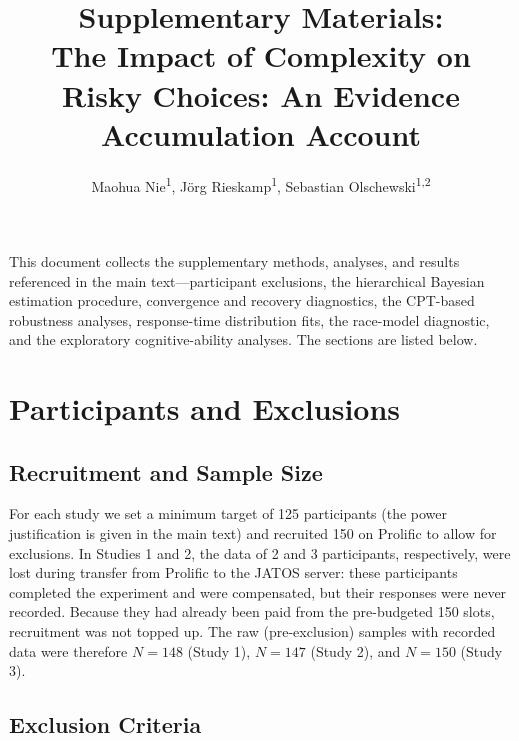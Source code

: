 \documentclass[man,floatsintext]{apa7}
\title{Supplementary Materials:\\The Impact of Complexity on Risky Choices: An Evidence Accumulation Account}
\author{
Maohua Nie\textsuperscript{1}, J\"org Rieskamp\textsuperscript{1}, Sebastian Olschewski\textsuperscript{1,2}
}
\affiliation{
\textsuperscript{1}Department of Psychology, University of Basel, Switzerland\\
\textsuperscript{2}Warwick Business School, University of Warwick, UK
}
\begin{document}
\maketitle

\setcounter{section}{0}
\renewcommand{\thesection}{S\arabic{section}}
\renewcommand{\thetable}{S\arabic{table}}
\renewcommand{\thefigure}{S\arabic{figure}}
\renewcommand{\theequation}{S\arabic{equation}}

This document collects the supplementary methods, analyses, and results referenced in the main text---participant exclusions, the hierarchical Bayesian estimation procedure, convergence and recovery diagnostics, the CPT-based robustness analyses, response-time distribution fits, the race-model diagnostic, and the exploratory cognitive-ability analyses. The sections are listed below.

\setcounter{tocdepth}{2}
{\hypersetup{linkcolor=black}\tableofcontents}
\clearpage

\section{Participants and Exclusions}
\label{sec:exclusions}

\subsection{Recruitment and Sample Size}

For each study we set a minimum target of 125 participants (the power justification is given in the main text) and recruited 150 on Prolific to allow for exclusions. In Studies 1 and 2, the data of 2 and 3 participants, respectively, were lost during transfer from Prolific to the JATOS server: these participants completed the experiment and were compensated, but their responses were never recorded. Because they had already been paid from the pre-budgeted 150 slots, recruitment was not topped up. The raw (pre-exclusion) samples with recorded data were therefore $N = 148$ (Study 1), $N = 147$ (Study 2), and $N = 150$ (Study 3).

\subsection{Exclusion Criteria}
\end{document}
